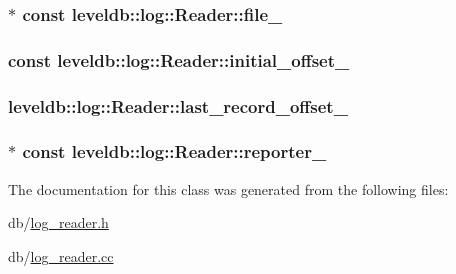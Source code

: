 \subsubsection[{file\+\_\+}]{$\ast$ const leveldb\+::log\+::\+Reader\+::file\+\_\+\hspace{0.3cm}{\ttfamily [private]}}\label{classleveldb_1_1log_1_1_reader_a6e58e3ad57c4c1e3bae658c6bfd0dbe9}
\hypertarget{classleveldb_1_1log_1_1_reader_a2de3030899a0d2803e983f7e567c5ca5}{}
\subsubsection[{initial\+\_\+offset\+\_\+}]{ const leveldb\+::log\+::\+Reader\+::initial\+\_\+offset\+\_\+\hspace{0.3cm}{\ttfamily [private]}}\label{classleveldb_1_1log_1_1_reader_a2de3030899a0d2803e983f7e567c5ca5}
\hypertarget{classleveldb_1_1log_1_1_reader_adf95d56ac65b7d75b2aed71040f5cde6}{}
\subsubsection[{last\+\_\+record\+\_\+offset\+\_\+}]{ leveldb\+::log\+::\+Reader\+::last\+\_\+record\+\_\+offset\+\_\+\hspace{0.3cm}{\ttfamily [private]}}\label{classleveldb_1_1log_1_1_reader_adf95d56ac65b7d75b2aed71040f5cde6}
\hypertarget{classleveldb_1_1log_1_1_reader_a1b678a3e93092d4c43a37e2042e7117f}{}
\subsubsection[{reporter\+\_\+}]{$\ast$ const leveldb\+::log\+::\+Reader\+::reporter\+\_\+\hspace{0.3cm}{\ttfamily [private]}}\label{classleveldb_1_1log_1_1_reader_a1b678a3e93092d4c43a37e2042e7117f}


The documentation for this class was generated from the following files\+:\begin{DoxyCompactItemize}
\item 
db/\hyperlink{log__reader_8h}{log\+\_\+reader.\+h}\item 
db/\hyperlink{log__reader_8cc}{log\+\_\+reader.\+cc}\end{DoxyCompactItemize}
